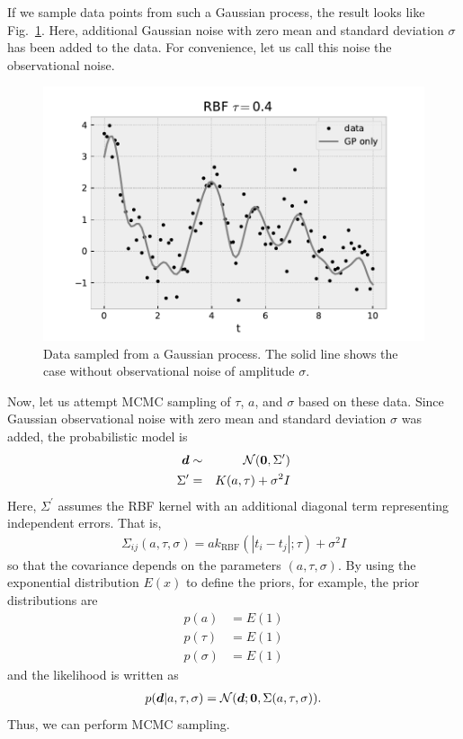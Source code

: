 If we sample data points from such a Gaussian process, the result looks like Fig.~\ref{fig:gp1}. Here, additional Gaussian noise with zero mean and standard deviation $\sigma$ has been added to the data. For convenience, let us call this noise the observational noise.
\begin{figure}[htb]
\begin{center}
\includegraphics[width=\linewidth]{fig/gp/gp1.pdf}
\caption{Data sampled from a Gaussian process. The solid line shows the case without observational noise of amplitude $\sigma$.\label{fig:gp1}}
\end{center}
\end{figure}

Now, let us attempt MCMC sampling of $\tau$, $a$, and $\sigma$ based on these data. Since Gaussian observational noise with zero mean and standard deviation $\sigma$ was added, the probabilistic model is
\begin{eqnarray}
\label{eq:gpmodel0}
\boldsymbol{d} &\sim& \mathcal{N}(\boldsymbol{0},\Sigma^\prime ) \\
\Sigma^\prime &=& K(a, \tau) + \sigma^2 I
\end{eqnarray}
Here, $\Sigma^\prime$ assumes the RBF kernel with an additional diagonal term representing independent errors. That is,
\begin{align}
 \Sigma_{ij} (a, \tau, \sigma) = a k_\mathrm{RBF} (|t_i - t_j|; \tau) + \sigma^2 I
\end{align}
so that the covariance depends on the parameters $(a, \tau, \sigma)$. By using the exponential distribution $E(x)$ to define the priors, for example, the prior distributions are
\begin{align}
    p(a) &= E(1) \\
    p(\tau) &= E(1) \\
    p(\sigma) &= E(1) 
\end{align}
and the likelihood is written as
\begin{align}
    p(\boldsymbol{d}|a, \tau, \sigma) = \mathcal{N}(\boldsymbol{d};\boldsymbol{0},  \Sigma (a, \tau, \sigma) ).
\end{align}
Thus, we can perform MCMC sampling.

